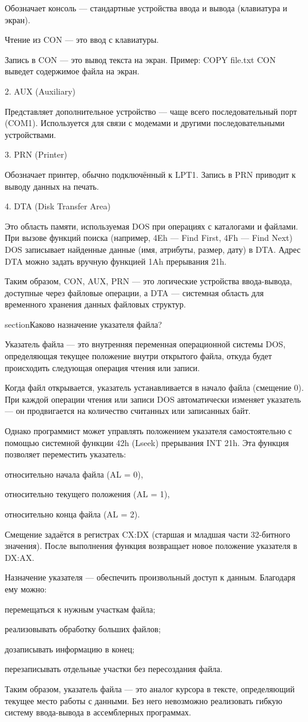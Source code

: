 Обозначает консоль — стандартные устройства ввода и вывода (клавиатура и экран).

Чтение из CON — это ввод с клавиатуры.

Запись в CON — это вывод текста на экран.
Пример: COPY file.txt CON выведет содержимое файла на экран.

2. AUX (Auxiliary)

Представляет дополнительное устройство — чаще всего последовательный порт (COM1).
Используется для связи с модемами и другими последовательными устройствами.

3. PRN (Printer)

Обозначает принтер, обычно подключённый к LPT1.
Запись в PRN приводит к выводу данных на печать.

4. DTA (Disk Transfer Area)

Это область памяти, используемая DOS при операциях с каталогами и файлами.
При вызове функций поиска (например, 4Eh — Find First, 4Fh — Find Next) DOS записывает найденные данные (имя, атрибуты, размер, дату) в DTA.
Адрес DTA можно задать вручную функцией 1Ah прерывания 21h.

Таким образом, CON, AUX, PRN — это логические устройства ввода-вывода, доступные через файловые операции, а DTA — системная область для временного хранения данных файловых структур.


section{Каково назначение указателя файла?}

Указатель файла — это внутренняя переменная операционной системы DOS, определяющая текущее положение внутри открытого файла, откуда будет происходить следующая операция чтения или записи.

Когда файл открывается, указатель устанавливается в начало файла (смещение 0). При каждой операции чтения или записи DOS автоматически изменяет указатель — он продвигается на количество считанных или записанных байт.

Однако программист может управлять положением указателя самостоятельно с помощью системной функции 42h (Lseek) прерывания INT 21h. Эта функция позволяет переместить указатель:

относительно начала файла (AL = 0),

относительно текущего положения (AL = 1),

относительно конца файла (AL = 2).

Смещение задаётся в регистрах CX:DX (старшая и младшая части 32-битного значения). После выполнения функция возвращает новое положение указателя в DX:AX.

Назначение указателя — обеспечить произвольный доступ к данным. Благодаря ему можно:

перемещаться к нужным участкам файла;

реализовывать обработку больших файлов;

дозаписывать информацию в конец;

перезаписывать отдельные участки без пересоздания файла.

Таким образом, указатель файла — это аналог курсора в тексте, определяющий текущее место работы с данными. Без него невозможно реализовать гибкую систему ввода-вывода в ассемблерных программах.

\endinput
